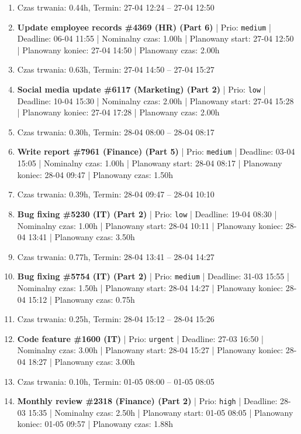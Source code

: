 {\begin{enumerate}
  \item [\textbf{PRZERWA}] Czas trwania: 0.44h, Termin: 27-04 12:24 -- 27-04 12:50
  \item [\textbf{14658}] \textbf{Update employee records \#4369 (HR) (Part 6)} | Prio: \texttt{medium} | Deadline: 06-04 11:55 | Nominalny czas: 1.00h | Planowany start: 27-04 12:50 | Planowany koniec: 27-04 14:50 | Planowany czas: 2.00h
  \item [\textbf{PRZERWA}] Czas trwania: 0.63h, Termin: 27-04 14:50 -- 27-04 15:27
  \item [\textbf{14700}] \textbf{Social media update \#6117 (Marketing) (Part 2)} | Prio: \texttt{low} | Deadline: 10-04 15:30 | Nominalny czas: 2.00h | Planowany start: 27-04 15:28 | Planowany koniec: 27-04 17:28 | Planowany czas: 2.00h
  \item [\textbf{PRZERWA}] Czas trwania: 0.30h, Termin: 28-04 08:00 -- 28-04 08:17
  \item [\textbf{14657}] \textbf{Write report \#7961 (Finance) (Part 5)} | Prio: \texttt{medium} | Deadline: 03-04 15:05 | Nominalny czas: 1.00h | Planowany start: 28-04 08:17 | Planowany koniec: 28-04 09:47 | Planowany czas: 1.50h
  \item [\textbf{PRZERWA}] Czas trwania: 0.39h, Termin: 28-04 09:47 -- 28-04 10:10
  \item [\textbf{14680}] \textbf{Bug fixing \#5230 (IT) (Part 2)} | Prio: \texttt{low} | Deadline: 19-04 08:30 | Nominalny czas: 1.00h | Planowany start: 28-04 10:11 | Planowany koniec: 28-04 13:41 | Planowany czas: 3.50h
  \item [\textbf{PRZERWA}] Czas trwania: 0.77h, Termin: 28-04 13:41 -- 28-04 14:27
  \item [\textbf{14631}] \textbf{Bug fixing \#5754 (IT) (Part 2)} | Prio: \texttt{medium} | Deadline: 31-03 15:55 | Nominalny czas: 1.50h | Planowany start: 28-04 14:27 | Planowany koniec: 28-04 15:12 | Planowany czas: 0.75h
  \item [\textbf{PRZERWA}] Czas trwania: 0.25h, Termin: 28-04 15:12 -- 28-04 15:26
  \item [\textbf{14605}] \textbf{Code feature \#1600 (IT)} | Prio: \texttt{urgent} | Deadline: 27-03 16:50 | Nominalny czas: 3.00h | Planowany start: 28-04 15:27 | Planowany koniec: 28-04 18:27 | Planowany czas: 3.00h
  \item [\textbf{PRZERWA}] Czas trwania: 0.10h, Termin: 01-05 08:00 -- 01-05 08:05
  \item [\textbf{14618}] \textbf{Monthly review \#2318 (Finance) (Part 2)} | Prio: \texttt{high} | Deadline: 28-03 15:35 | Nominalny czas: 2.50h | Planowany start: 01-05 08:05 | Planowany koniec: 01-05 09:57 | Planowany czas: 1.88h

\end{enumerate}}
